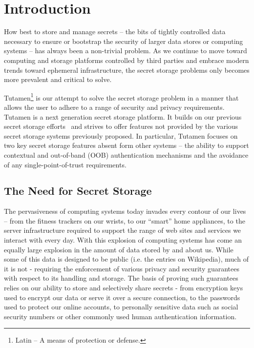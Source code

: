 \section{Introduction}
\label{sec:intro}

How best to store and manage secrets -- the bits of tightly controlled
data necessary to ensure or bootstrap the security of larger data
stores or computing systems -- has always been a non-trivial
problem. As we continue to move toward computing and storage platforms
controlled by third parties and embrace modern trends toward ephemeral
infrastructure, the secret storage problems only becomes more
prevalent and critical to solve.

Tutamen\footnote{Latin -- A means of protection or defense.} is our
attempt to solve the secret storage problem in a manner that allows
the user to adhere to a range of security and privacy requirements.
Tutamen is a next generation secret storage platform. It builds on our
previous secret storage efforts~\cite{custos-trios} and strives to
offer features not provided by the various secret storage systems
previously proposed. In particular, Tutamen focuses on two key secret
storage features absent form other systems -- the ability to support
contextual and out-of-band (OOB) authentication mechanisms and the
avoidance of any single-point-of-trust requirements.

\subsection{The Need for Secret Storage}

The pervasiveness of computing systems today invades every contour of
our lives -- from the fitness trackers on our wrists, to our ``smart''
home appliances, to the server infrastructure required to support the
range of web sites and services we interact with every day. With this
explosion of computing systems has come an equally large explosion in
the amount of data stored by and about us. While some of this data is
designed to be public (i.e. the entries on Wikipedia), much of it is
not - requiring the enforcement of various privacy and security
guarantees with respect to its handling and storage. The basis of
proving such guarantees relies on our ability to store and selectively
share secrets - from encryption keys used to encrypt our data or
serve it over a secure connection, to the passwords used to protect
our online accounts, to personally sensitive data such as social
security numbers or other commonly used human authentication
information.

